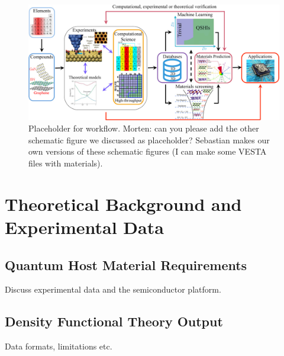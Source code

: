 \documentclass[superscriptaddress,unsortedaddress,
 amsmath,amssymb,
 aps,
]{revtex4-2}
\begin{document}
\begin{figure}
    \centering
    \includegraphics[width=\textwidth]{figures/ht-workflow.jpg}
    \caption{Placeholder for workflow. Morten: can you please add the other schematic figure we discussed as placeholder? Sebastian makes our own versions of these schematic figures (I can make some VESTA files with materials). }
    \label{fig:ht-workflow}
\end{figure}

\section*{Theoretical Background and Experimental Data} 


\subsection*{Quantum Host Material Requirements} %
Discuss experimental data and the semiconductor platform. 


\subsection*{Density Functional Theory Output} %
Data formats, limitations etc.  
\end{document}
